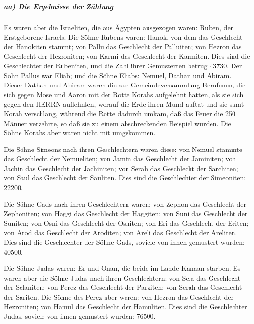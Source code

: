 \hypertarget{aa-die-ergebnisse-der-zuxe4hlung}{%
\subparagraph{aa) Die Ergebnisse der
Zählung}\label{aa-die-ergebnisse-der-zuxe4hlung}}

Es waren aber die Israeliten, die aus Ägypten ausgezogen waren:
Ruben, der Erstgeborene Israels. Die Söhne Rubens waren:
Hanok, von dem das Geschlecht der Hanokiten stammt; von Pallu das
Geschlecht der Palluiten; von Hezron das Geschlecht der
Hezroniten; von Karmi das Geschlecht der Karmiten. Dies
sind die Geschlechter der Rubeniten, und die Zahl ihrer Gemusterten
betrug 43730. Der Sohn Pallus war Eliab; und
die Söhne Eliabs: Nemuel, Dathan und Abiram. Dieser Dathan und Abiram
waren die zur Gemeindeversammlung Berufenen, die sich gegen Mose und
Aaron mit der Rotte Korahs aufgelehnt hatten, als sie sich gegen den
HERRN auflehnten, worauf die Erde ihren Mund auftat und
sie samt Korah verschlang, während die Rotte dadurch umkam, daß das
Feuer die 250 Männer verzehrte, so daß sie zu einem abschreckenden
Beispiel wurden. Die Söhne Korahs aber waren nicht mit
umgekommen.

Die Söhne Simeons nach ihren Geschlechtern waren diese:
von Nemuel stammte das Geschlecht der Nemueliten; von Jamin das
Geschlecht der Jaminiten; von Jachin das Geschlecht der Jachiniten;
von Serah das Geschlecht der Sarchiten; von Saul das
Geschlecht der Sauliten. Dies sind die Geschlechter der
Simeoniten: 22200.

Die Söhne Gads nach ihren Geschlechtern waren: von Zephon
das Geschlecht der Zephoniten; von Haggi das Geschlecht der Haggiten;
von Suni das Geschlecht der Suniten; von Osni das
Geschlecht der Osniten; von Eri das Geschlecht der Eriten;
von Arod das Geschlecht der Aroditen; von Areli das
Geschlecht der Areliten. Dies sind die Geschlechter der
Söhne Gads, soviele von ihnen gemustert wurden: 40500.

Die Söhne Judas waren: Er und Onan, die beide im Lande
Kanaan starben. Es waren aber die Söhne Judas nach ihren
Geschlechtern: von Sela das Geschlecht der Selaniten; von Perez das
Geschlecht der Parziten; von Serah das Geschlecht der Sariten.
Die Söhne des Perez aber waren: von Hezron das Geschlecht
der Hezroniten; von Hamul das Geschlecht der Hamuliten.
Dies sind die Geschlechter Judas, soviele von ihnen
gemustert wurden: 76500.

